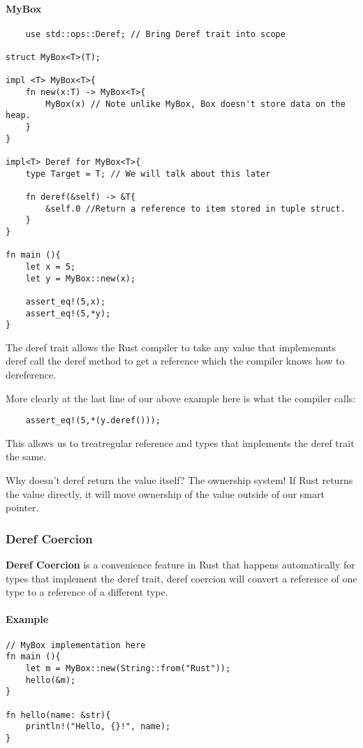 \paragraph*{MyBox}\begin{lstlisting}
    use std::ops::Deref; // Bring Deref trait into scope

struct MyBox<T>(T);

impl <T> MyBox<T>{
    fn new(x:T) -> MyBox<T>{
        MyBox(x) // Note unlike MyBox, Box doesn't store data on the heap.
    }
}

impl<T> Deref for MyBox<T>{
    type Target = T; // We will talk about this later

    fn deref(&self) -> &T{
        &self.0 //Return a reference to item stored in tuple struct.
    }
}

fn main (){
    let x = 5;
    let y = MyBox::new(x);

    assert_eq!(5,x);
    assert_eq!(5,*y);
}
\end{lstlisting}
The deref trait allows the Rust compiler to take any value that implememnts deref call the deref method to get a reference which the compiler knows how to dereference. 

More clearly at the last line of our above example here is what the compiler calls:\begin{lstlisting}
    assert_eq!(5,*(y.deref()));
\end{lstlisting}

This allows us to treatregular reference and types that implements the deref trait the same.

Why doesn't deref return the value itself? The ownership system! If Rust returns the value directly, it will move ownership of the value outside of our smart pointer.

\subsubsection{Deref Coercion}

\begin{definition}
    \textbf{Deref Coercion} is a convenience feature in Rust that happens automatically for types that implement the deref trait, deref coercion will convert a reference of one type to a reference of a different type.      
\end{definition}
\paragraph*{Example}\begin{lstlisting}
// MyBox implementation here
fn main (){
    let m = MyBox::new(String::from("Rust"));
    hello(&m); 
}

fn hello(name: &str){
    println!("Hello, {}!", name);
}
\end{lstlisting}

